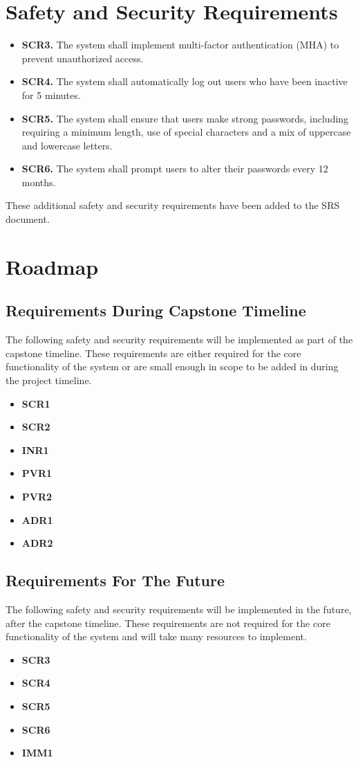 \documentclass{article}
\begin{document}
\section{Safety and Security Requirements}
\begin{itemize}
    \item \textbf{SCR3.} The system shall implement multi-factor authentication (MHA) to prevent unauthorized access.
    \item \textbf{SCR4.} The system shall automatically log out users who have been inactive for 5 minutes.
    \item \textbf{SCR5.} The system shall ensure that users make strong passwords, including requiring a minimum length, use of special characters and a mix of uppercase and lowercase letters.
    \item \textbf{SCR6.} The system shall prompt users to alter their passwords every 12 months.
\end{itemize}
These additional safety and security requirements have been added to the SRS document.

\section{Roadmap}
\subsection{Requirements During Capstone Timeline}
The following safety and security requirements will be implemented as part of the capstone timeline. These requirements are either required for the core functionality of the system or are small enough in scope to be added in during the project timeline.
\begin{itemize}
    \item \textbf{SCR1}
    \item \textbf{SCR2}
    \item \textbf{INR1}
    \item \textbf{PVR1}
    \item \textbf{PVR2}
    \item \textbf{ADR1}
    \item \textbf{ADR2}
\end{itemize}
\subsection{Requirements For The Future}
The following safety and security requirements will be implemented in the future, after the capstone timeline. These requirements are not required for the core functionality of the system and will take many resources to implement.
\begin{itemize}
    \item \textbf{SCR3}
    \item \textbf{SCR4}
    \item \textbf{SCR5}
    \item \textbf{SCR6}
    \item \textbf{IMM1}
\end{itemize}
\end{document}
